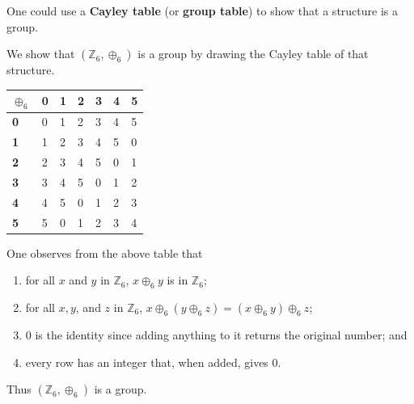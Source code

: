 One could use a \textbf{Cayley table} (or \textbf{group table}) to show that a structure is a group.
\begin{example}
    We show that $(\mathbb{Z}_6, \oplus_6)$ is a group by drawing the Cayley table of that structure.
    \begin{table}[h]
        \centering
        \begin{tabular}{|l|l|l|l|l|l|l|}
        \hline
        \textbf{$\oplus_6$} & \textbf{0} & \textbf{1} & \textbf{2} & \textbf{3} & \textbf{4} & \textbf{5} \\ \hline
        \textbf{0}          & 0          & 1          & 2          & 3          & 4          & 5          \\ \hline
        \textbf{1}          & 1          & 2          & 3          & 4          & 5          & 0          \\ \hline
        \textbf{2}          & 2          & 3          & 4          & 5          & 0          & 1          \\ \hline
        \textbf{3}          & 3          & 4          & 5          & 0          & 1          & 2          \\ \hline
        \textbf{4}          & 4          & 5          & 0          & 1          & 2          & 3          \\ \hline
        \textbf{5}          & 5          & 0          & 1          & 2          & 3          & 4          \\ \hline
        \end{tabular}
    \end{table}

    \newpage

    One observes from the above table that
    \begin{enumerate}
        \item for all $x$ and $y$ in $\mathbb{Z}_6$, $x \oplus_6 y$ is in $\mathbb{Z}_6$;
        \item for all $x, y$, and $z$ in $\mathbb{Z}_6$, $x \oplus_6 (y \oplus_6 z) = (x \oplus_6 y) \oplus_6 z$;
        \item 0 is the identity since adding anything to it returns the original number; and
        \item every row has an integer that, when added, gives 0.
    \end{enumerate}
    Thus $(\mathbb{Z}_6, \oplus_6)$ is a group.
\end{example}


